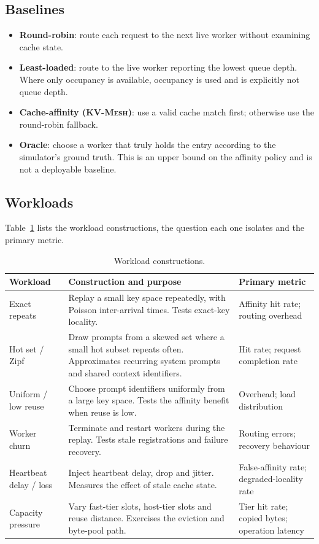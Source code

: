 \documentclass[10pt,twocolumn]{article}
\newcommand{\kvmesh}{\textsc{KV-Mesh}}
\begin{document}
\subsection{Baselines}

\begin{itemize}
\item \textbf{Round-robin}: route each request to the next live worker without
examining cache state.
\item \textbf{Least-loaded}: route to the live worker reporting the lowest
queue depth. Where only occupancy is available, occupancy is used and is
explicitly not queue depth.
\item \textbf{Cache-affinity (\kvmesh)}: use a valid cache match first;
otherwise use the round-robin fallback.
\item \textbf{Oracle}: choose a worker that truly holds the entry according to
the simulator's ground truth. This is an upper bound on the affinity policy
and is not a deployable baseline.
\end{itemize}

\subsection{Workloads}

Table~\ref{tab:workloads} lists the workload constructions, the question each
one isolates and the primary metric.

\begin{table}[t]
\centering
\caption{Workload constructions.}
\label{tab:workloads}
\setlength{\tabcolsep}{3pt}
\begin{tabular}{p{}p{}p{}}
\toprule
\textbf{Workload} & \textbf{Construction and purpose} & \textbf{Primary metric} \\
\midrule
Exact repeats & Replay a small key space repeatedly, with Poisson inter-arrival times. Tests exact-key locality. & Affinity hit rate; routing overhead \\
Hot set / Zipf & Draw prompts from a skewed set where a small hot subset repeats often. Approximates recurring system prompts and shared context identifiers. & Hit rate; request completion rate \\
Uniform / low reuse & Choose prompt identifiers uniformly from a large key space. Tests the affinity benefit when reuse is low. & Overhead; load distribution \\
Worker churn & Terminate and restart workers during the replay. Tests stale registrations and failure recovery. & Routing errors; recovery behaviour \\
Heartbeat delay / loss & Inject heartbeat delay, drop and jitter. Measures the effect of stale cache state. & False-affinity rate; degraded-locality rate \\
Capacity pressure & Vary fast-tier slots, host-tier slots and reuse distance. Exercises the eviction and byte-pool path. & Tier hit rate; copied bytes; operation latency \\
\bottomrule
\end{tabular}
\end{table}
\end{document}
